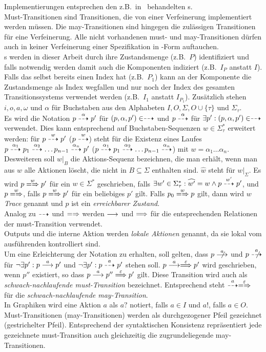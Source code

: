 Implementierungen entsprechen den z.B.\ in~\cite{Schinko2016BA} behandelten
\EIO{}s.\\
Must-Transitionen sind Transitionen, die von einer Verfeinerung implementiert
werden müssen. Die may-Transitionen sind hingegen die zulässigen Transitionen
für eine Verfeinerung. Alle nicht vorhandenen must- und may-Transitionen dürfen
auch in keiner Verfeinerung einer Spezifikation in \MEIO{}-Form auftauchen.\\
\MEIO{}s  werden in dieser Arbeit durch ihre Zustandsmenge (z.B.\ $P$)
identifiziert und falls notwendig werden damit auch die Komponenten indiziert
(z.B.\ $I_P$ anstatt $I$). Falls das \MEIO{} selbst bereits einen Index hat
(z.B.\ $P_1$) kann an der Komponente die Zustandsmenge als Index wegfallen und
nur noch der Index des gesamten Transitionssystems verwendet werden (z.B.\
$I_1$ anstatt $I_{P_1}$). Zusätzlich stehen $i,o,a,\omega$ und $\alpha$ für
Buchstaben aus den Alphabeten $I,O,\Sigma ,O\cup\{\tau\}$ und $\Sigma_\tau$.\\
Es wird die Notation $p\may[\alpha] p'$ für $(p,\alpha,p')\in\may$ und
$p\may[\alpha]$ für $\exists p':(p,\alpha,p')\in\may$ verwendet. Dies kann
entsprechend auf Buchstaben-Sequenzen $w\in\Sigma_{\tau}^*$ erweitert werden:
für $p\may[w]p'$ ($p\may[w]$) steht für die Existenz eines Laufes $p\may[\alpha
_1]p_1\may[\alpha _2]\dots p_{n-1}\may[\alpha _n] p'$ ($p\may[\alpha _1] p_1
\may[\alpha _2]\dots p_{n-1}\may[\alpha _n]$) mit $w=\alpha _1\dots \alpha
_n$.\\
Desweiteren soll $w|_B$ die Aktions-Sequenz bezeichnen, die man erhält, wenn
man aus $w$ alle Aktionen löscht, die nicht in $B\subseteq\Sigma$ enthalten
sind. $\widehat{w}$ steht für $w|_{\Sigma}$. Es wird $p\weakmay[w] p'$
für ein $w\in\Sigma ^*$ geschrieben, falls $\exists
w'\in\Sigma_{\tau}^*:\widehat{w'}=w\land p\may[w']p'$, und $p\weakmay[w]$,
falls $p\weakmay[w] p'$ für ein beliebiges $p'$ gilt. Falls $p_0\weakmay[w] p$
gilt, dann wird $w$ \emph{Trace} genannt und $p$ ist ein \emph{erreichbarer
Zustand}.\\
Analog zu $\may$ und $\weakmay$ werden $\must$ und $\weakmust$ für die
entsprechenden Relationen der must-Transition verwendet.\\
Outputs und die interne Aktion werden \emph{lokale Aktionen} genannt, da sie
lokal vom ausführenden \MEIO{} kontrolliert sind.\\
Um eine Erleichterung der Notation zu erhalten, soll gelten, dass $p\nmust[a]$
und $p\nmay[a]$ für $\neg\exists p': p\must[a]p'$ und $\neg\exists p':
p\may[a]p'$ stehen soll. $p\must[a]\weakmust[\varepsilon]p'$ wird geschrieben,
wenn $p''$ existiert, so dass $p\must[a]p''\weakmust[\varepsilon]p'$ gilt.
Diese Transition wird auch als \emph{schwach-nachlaufende must-Transition}
bezeichnet. Entsprechend steht $\may[a]\weakmay[\varepsilon]$ für die
\emph{schwach-nachlaufende may-Transition}.\\
In Graphiken wird eine Aktion $a$ als $a?$ notiert, falls $a\in I$ und $a!$,
falls $a\in O$. Must-Transitionen (may-Transitionen) werden als durchgezogener
Pfeil gezeichnet (gestrichelter Pfeil). Entsprechend der syntaktischen
Konsistenz repräsentiert jede gezeichnete must-Transition auch gleichzeitig die
zugrundeliegende may-Transitionen.

